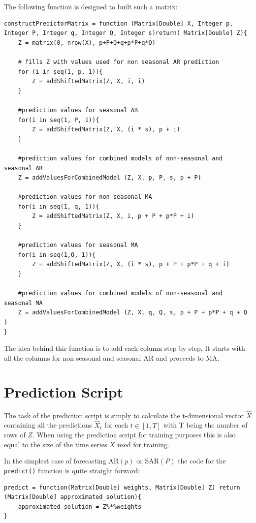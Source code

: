 The following function is designed to built such a matrix:
\begin{lstlisting}[caption=Prediction of \acs{AR}$(p)$ or  \acs{SAR}$(P)$ ,captionpos=b]
constructPredictorMatrix = function (Matrix[Double] X, Integer p, Integer P, Integer q, Integer Q, Integer s)return( Matrix[Double] Z){
	Z = matrix(0, nrow(X), p+P+Q+q+p*P+q*Q)

	# fills Z with values used for non seasonal AR prediction
	for	(i in seq(1, p, 1)){
		Z = addShiftedMatrix(Z, X, i, i)
	}

	#prediction values for seasonal AR 
	for(i in seq(1, P, 1)){
		Z = addShiftedMatrix(Z, X, (i * s), p + i)
	}

	#prediction values for combined models of non-seasonal and seasonal AR
	Z = addValuesForCombinedModel (Z, X, p, P, s, p + P)

	#prediction values for non seasonal MA 
	for(i in seq(1, q, 1)){
		Z = addShiftedMatrix(Z, X, i, p + P + p*P + i)
	}

	#prediction values for seasonal MA 
	for(i in seq(1,Q, 1)){
		Z = addShiftedMatrix(Z, X, (i * s), p + P + p*P + q + i)
	}

	#prediction values for combined models of non-seasonal and seasonal MA
	Z = addValuesForCombinedModel (Z, X, q, Q, s, p + P + p*P + q + Q )
}
\end{lstlisting}

The idea behind this function is to add each column step by step. It starts with all the columns for non seasonal and seasonal \acl{AR} and proceeds to \acl{MA}.



\section{Prediction Script}

The task of the prediction script is simply to calculate the t-dimensional vector $\hat{X}$ containing all the predictions $\hat{X}_t$ for each $t \in [1,T]$ with T being the number of rows of  $Z$. When using the prediction script for training purposes this is also equal to the size of the time series $X$ used for training.

In the simplest case of forecasting \acs{AR}$(p)$ or  \acs{SAR}$(P)$  the code for the \lstinline{predict()} function is quite straight forward:

\begin{lstlisting}[caption=Prediction of \acs{AR}$(p)$ or  \acs{SAR}$(P)$ ,captionpos=b]
predict = function(Matrix[Double] weights, Matrix[Double] Z) return (Matrix[Double] approximated_solution){
	approximated_solution = Z%*%weights
}
\end{lstlisting}

